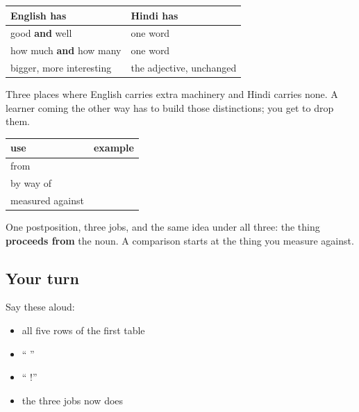 \begin{grammarlens}[title={Grammar Lens: what Hindi does without}]
\noindent
\begin{tabularx}{\linewidth}{@{}>{\raggedright\arraybackslash}X>{\raggedright\arraybackslash}X@{}}
\toprule
\textbf{English has} & \textbf{Hindi has} \\
\midrule
good \textbf{and} well & one word \\
how much \textbf{and} how many & one word \\
bigger, more interesting & the adjective, unchanged \\
\bottomrule
\end{tabularx}

Three places where English carries extra machinery and Hindi carries none. A learner coming the other way has to build those distinctions; you get to drop them.
\end{grammarlens}

\begin{grammarlens}[title={Grammar Lens: \hi{से}, doing a third job}]
\noindent
\begin{tabularx}{\linewidth}{@{}>{\raggedright\arraybackslash}X>{\raggedright\arraybackslash}X@{}}
\toprule
\textbf{use} & \textbf{example} \\
\midrule
from & \hi{घर} \hi{से} \\
by way of & \hi{बस} \hi{से} \\
measured against & \hi{आदमी} \hi{से} \hi{बड़ा} \\
\bottomrule
\end{tabularx}

One postposition, three jobs, and the same idea under all three: the thing \textbf{proceeds from} the noun. A comparison starts at the thing you measure against.
\end{grammarlens}

\subsection*{Your turn}
Say these aloud:

\begin{itemize}
\raggedright
  \item all five rows of the first table
  \item \textquotedblleft{}    \textquotedblright{}
  \item \textquotedblleft{}  !\textquotedblright{}
  \item the three jobs \textbf{} now does
\end{itemize}

